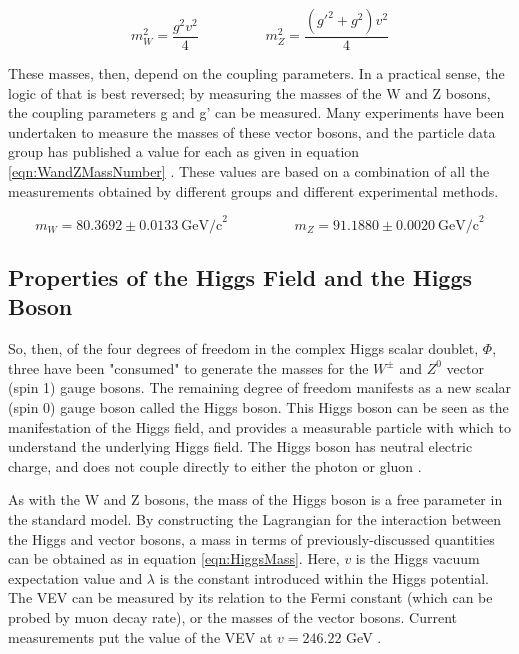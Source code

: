 \documentclass[12pt]{ucsddissertation}
\begin{document}
\begin{equation}\label{eqn:WandZMass}
    m^2_W = \frac{g^2 v^2}{4} \hspace{2cm} m^2_Z = \frac{(g'^2 + g^2)v^2}{4}
\end{equation}

These masses, then, depend on the coupling parameters. In a practical sense, the logic of that is best reversed; by measuring the masses of the W and Z bosons, the coupling parameters g and g' can be measured. Many experiments have been undertaken to measure the masses of these vector bosons, and the particle data group has published a value for each as given in equation \ref{eqn:WandZMassNumber} \cite{PDGReview}. These values are based on a combination of all the measurements obtained by different groups and different experimental methods.

\begin{equation}\label{eqn:WandZMassNumber}
    m_W = 80.3692 \pm 0.0133 \ \mathrm{GeV/c}^2 \hspace{2cm} m_Z = 91.1880 \pm 0.0020 \ \mathrm{GeV/c}^2
\end{equation}

\subsection{Properties of the Higgs Field and the Higgs Boson}

So, then, of the four degrees of freedom in the complex Higgs scalar doublet, $\Phi$, three have been "consumed" to generate the masses for the $W^{\pm}$ and $Z^0$ vector (spin 1) gauge bosons. The remaining degree of freedom manifests as a new scalar (spin 0) gauge boson called the Higgs boson. This Higgs boson can be seen as the manifestation of the Higgs field, and provides a measurable particle with which to understand the underlying Higgs field. The Higgs boson has neutral electric charge, and does not couple directly to either the photon or gluon \cite{SMOverview}.

As with the W and Z bosons, the mass of the Higgs boson is a free parameter in the standard model. By constructing the Lagrangian for the interaction between the Higgs and vector bosons, a mass in terms of previously-discussed quantities can be obtained as in equation \ref{eqn:HiggsMass}. Here, $v$ is the Higgs vacuum expectation value and $\lambda$ is the constant introduced within the Higgs potential. The VEV can be measured by its relation to the Fermi constant (which can be probed by muon decay rate), or the masses of the vector bosons. Current measurements put the value of the VEV at $v = 246.22$ GeV \cite{PDGReview}.
\end{document}
